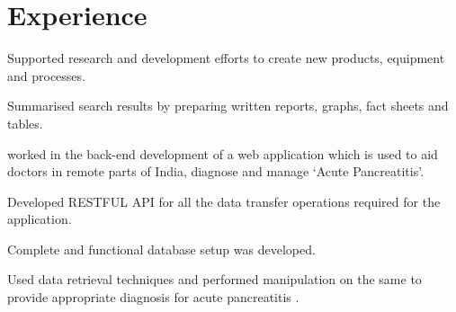 \documentclass[]{deedy-resume-reversed}
\begin{document}
%
%

%
%

%
%

\begin{minipage}[t]{0.60\textwidth}


\section{Experience}
\vspace{\topsep} %
\begin{tightemize}
\item Supported research and development efforts to create new products, equipment and processes.
\item Summarised search results by preparing written reports, graphs, fact sheets and tables.
\end{tightemize}
\sectionsep


\begin{tightemize}
\item worked in the back-end development of a web application which is used to aid doctors in remote parts of India, diagnose and manage ‘Acute Pancreatitis’.
\item Developed RESTFUL API for all the data transfer operations required for the application. 
\item Complete and functional database setup was developed.
\item Used data retrieval techniques and performed manipulation on the same to provide appropriate diagnosis for acute pancreatitis .
\end{tightemize}
\sectionsep




\end{minipage}
\end{document}
